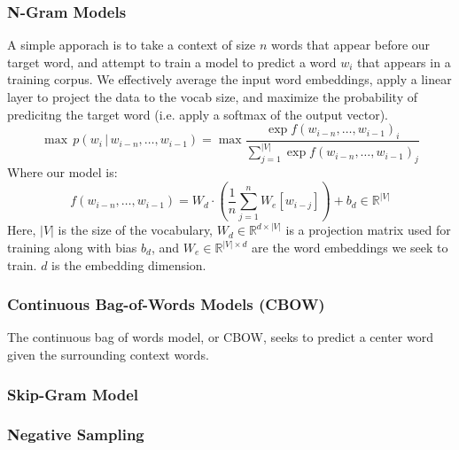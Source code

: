 \documentclass[twoside,twocolumn]{article}
\begin{document}
\subsubsection{N-Gram Models}
A simple apporach is to take a context of size $n$ words that appear before our
target word, and attempt to train a model to predict a word $w_i$ that appears
in a training corpus. We effectively average the input word embeddings, apply
a linear layer to project the data to the vocab size, and maximize the probability
of predicitng the target word (i.e. apply a softmax of the output vector).
\begin{equation}
  \max \, p(w_{i} \,|\, w_{i-n}, \dots, w_{i-1}) = \max \frac{\exp f(w_{i-n}, \dots, w_{i-1})_i}{\sum_{j=1}^{|V|}\exp f(w_{i-n}, \dots, w_{i-1})_j }
\end{equation}
Where our model is:
\begin{equation}
  f(w_{i-n}, \dots, w_{i-1}) = W_d \cdot \left( \frac{1}{n}\sum_{j=1}^n W_e[w_{i-j}] \right) + b_d \in \mathbb{R}^{|V|}
\end{equation}
Here, $|V|$ is the size of the vocabulary, $W_d\in\mathbb{R}^{d\times|V|}$ is
a projection matrix used for training along with bias $b_d$,
and $W_e\in\mathbb{R}^{|V|\times d}$ are the word embeddings we seek to train.
$d$ is the embedding dimension.
\subsubsection{Continuous Bag-of-Words Models (CBOW)}
The continuous bag of words model, or CBOW, seeks to predict a center word
given the surrounding context words. 
\subsubsection{Skip-Gram Model}
\subsubsection{Negative Sampling}




% 
% 

\end{document}
